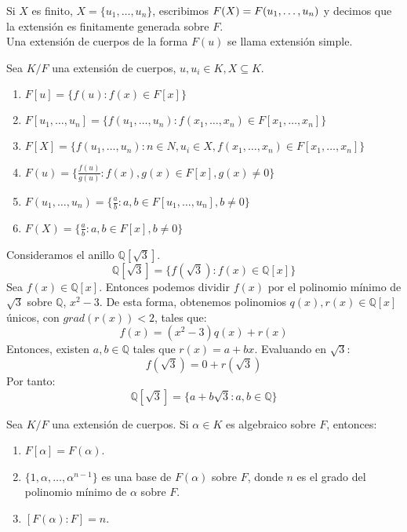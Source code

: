 \begin{definition}
    Si $X$ es finito, $X = \{u_1, \dots, u_n\}$, escribimos $F(X) =\\F(u_1, \dots, u_n)$ y decimos que la extensión es finitamente generada sobre $F$.\\
    Una extensión de cuerpos de la forma $F(u)$ se llama extensión simple.
\end{definition}

\begin{proposition}
    Sea $K/F$ una extensión de cuerpos, $u, u_i \in K, X \subseteq K$.
    \begin{enumerate}
        \item $F[u] = \{ f(u) : f(x) \in F[x] \}$
        \item $F[u_1, \dots, u_n] = \{ f(u_1, \dots, u_n) : f(x_1, \dots, x_n) \in F[x_1, \dots, x_n] \}$
        \item $F[X] = \{ f(u_1, \dots, u_n) : n \in N, u_i \in X, f(x_1, \dots, x_n) \in F[x_1, \dots, x_n] \}$
        \item $F(u) = \{ \frac{f(u)}{g(u)} : f(x), g(x) \in F[x], g(x) \neq 0 \}$
        \item $F(u_1, \dots, u_n) = \{ \frac{a}{b} : a, b \in F[u_1, \dots, u_n], b \neq 0 \}$
        \item $F(X) = \{ \frac{a}{b} : a, b \in F[x], b \neq 0 \}$
    \end{enumerate}
\end{proposition}

\begin{example}
    Consideramos el anillo $\mathbb{Q}[\sqrt{3}]$.
    $$\mathbb{Q}[\sqrt{3}] = \{ f(\sqrt{3}) : f(x) \in \mathbb{Q}[x] \}$$
    Sea $f(x) \in \mathbb{Q}[x]$. Entonces podemos dividir $f(x)$ por el polinomio mínimo de $\sqrt{3}$ sobre $\mathbb{Q}$, $x^2 - 3$. De esta forma, obtenemos polinomios $q(x), r(x) \in \mathbb{Q}[x]$ únicos, con $grad(r(x)) < 2$, tales que:
    $$f(x) = (x^2 - 3)q(x) + r(x)$$
    Entonces, existen $a, b \in \mathbb{Q}$ tales que $r(x) = a + bx$. Evaluando en $\sqrt{3}$:
    $$f(\sqrt{3}) = 0 + r(\sqrt{3})$$
    Por tanto:
    $$\mathbb{Q}[\sqrt{3}] = \{ a + b\sqrt{3} : a, b \in \mathbb{Q} \}$$
\end{example}

\begin{proposition}
    Sea $K/F$ una extensión de cuerpos. Si $\alpha \in K$ es algebraico sobre $F$, entonces:
    \begin{enumerate}
        \item $F[\alpha] = F(\alpha)$.
        \item $\{1, \alpha, \dots, \alpha^{n-1} \}$ es una base de $F(\alpha)$ sobre $F$, donde $n$ es el grado del polinomio mínimo de $\alpha$ sobre $F$.
        \item $[F(\alpha) : F] = n$.
    \end{enumerate}
\end{proposition}

